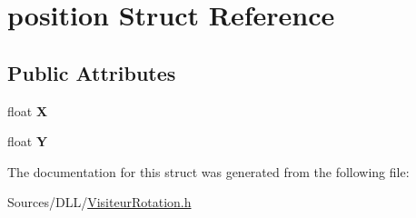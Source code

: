 \hypertarget{structposition}{}\section{position Struct Reference}
\label{structposition}
\subsection*{Public Attributes}
\begin{DoxyCompactItemize}
\item 
float {\bfseries X}
\item 
float {\bfseries Y}
\end{DoxyCompactItemize}


The documentation for this struct was generated from the following file\+:\begin{DoxyCompactItemize}
\item 
Sources/\+D\+L\+L/\hyperlink{_visiteur_rotation_8h}{Visiteur\+Rotation.\+h}\end{DoxyCompactItemize}
